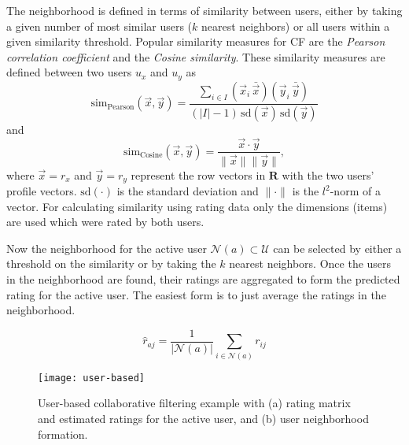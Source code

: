 \documentclass[nojss]{jss}
\newcommand{\set}[1]{\mathcal{#1}}
\newcommand{\mat}[1]{{\mathbf{#1}}}
\begin{document}
The neighborhood is defined in terms of similarity between users,
either by taking a given number of most similar users ($k$ nearest neighbors)
or all users within
a given similarity threshold.
Popular similarity measures for CF are
the \emph{Pearson correlation coefficient} and
the \emph{Cosine similarity}. These similarity measures are defined
between two users $u_x$ and $u_y$ as
\begin{equation}
\mathrm{sim_{Pearson}}(\vec{x},\vec{y}) =
	    \frac{\sum_{i \in I} (\vec{x}_i \, \bar{\vec{x}})(\vec{y}_i \, \bar{\vec{y}})}
		{(|I| -1) \, \mathrm{sd}(\vec{x}) \, \mathrm{sd}(\vec{y})}
\end{equation}
and
\begin{equation}
\mathrm{sim_{Cosine}}(\vec{x},\vec{y}) =
	    \frac{\vec{x}\cdot\vec{y}}
		    {\|\vec{x}\| \|\vec{y}\|},
\end{equation}
where
$\vec{x} = r_{x}$ and
$\vec{y} = r_{y}$ represent the
row vectors in $\mat{R}$ with the
two users' profile vectors.
$\mathrm{sd}(\cdot)$ is the standard deviation and
$\|\cdot\|$ is the $l^2$-norm of a vector.
For calculating similarity using rating data only the dimensions (items)
are used which were rated by both users.

Now the neighborhood for the active user $\set{N}(a) \subset \set{U}$
can be selected
by either a threshold on the similarity or by taking the
$k$ nearest neighbors.
Once the users in the neighborhood are found, their ratings are
aggregated to form the predicted rating for the active user.
The easiest form is to just average the ratings in the neighborhood.

\begin{equation}
\hat{r}_{aj}=\frac{1}{|\set{N}(a)|} \sum_{i\in\set{N}(a)} r_{ij}
\label{equ:aggregation1}
\end{equation}

\begin{figure}
\centerline{\texttt{[image: user-based]}}
\caption{User-based collaborative filtering example with (a) rating matrix
and estimated ratings for the active user, and
(b) user neighborhood formation.
}
\label{fig:UBCF}
\end{figure}
\end{document}

